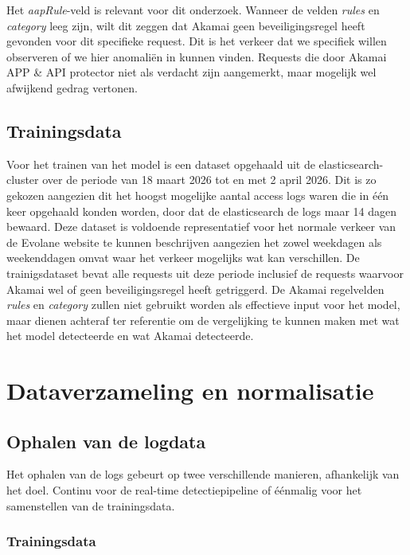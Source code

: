 Het \textit{aapRule}-veld is relevant voor dit onderzoek. Wanneer de velden \textit{rules} en \textit{category} leeg zijn, wilt dit zeggen dat Akamai geen beveiligingsregel heeft gevonden voor dit specifieke request. Dit is het verkeer dat we specifiek willen observeren of we hier anomaliën in kunnen vinden. Requests die door Akamai APP & API protector niet als verdacht zijn aangemerkt, maar mogelijk wel afwijkend gedrag vertonen. 


\subsection{Trainingsdata}
\label{subsec:trainingsdata}

Voor het trainen van het model is een dataset opgehaald uit de elasticsearch-cluster over de periode van 18 maart 2026 tot en met 2 april 2026. Dit is zo gekozen aangezien dit het hoogst mogelijke aantal access logs waren die in één keer opgehaald konden worden, door dat de elasticsearch de logs maar 14 dagen bewaard. 
Deze dataset is voldoende representatief voor het normale verkeer van de Evolane website te kunnen beschrijven aangezien het zowel weekdagen als weekenddagen omvat waar het verkeer mogelijks wat kan verschillen. De trainigsdataset bevat alle requests uit deze periode inclusief de requests waarvoor Akamai wel of geen beveiligingsregel heeft getriggerd. De Akamai regelvelden \textit{rules} en \textit{category} zullen niet gebruikt worden als effectieve input voor het model, maar dienen achteraf ter referentie om de vergelijking te kunnen maken met wat het model detecteerde en wat Akamai detecteerde.

\section{Dataverzameling en normalisatie} 
\label{sec:dataverzameling-normalisatie}

\subsection{Ophalen van de logdata} 
\label{subsec:ophalen-logdata}

Het ophalen van de logs gebeurt op twee verschillende manieren, afhankelijk van het doel. Continu voor de real-time detectiepipeline of éénmalig voor het samenstellen van de trainingsdata. 

\subsubsection{Trainingsdata} 
\label{subsubsec:ophalen-trainingsdata}

